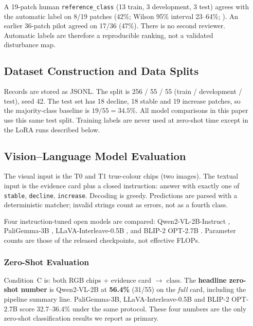 \documentclass[11pt]{article}
\begin{document}
A 19-patch human \texttt{reference\_class} (13 train, 3 development,
3 test) agrees with the automatic label on 8/19 patches (42\%;
Wilson 95\% interval 23--64\%; \citealp{wilson1927}). An earlier
36-patch pilot agreed on 17/36 (47\%). There is no second reviewer.
Automatic labels are therefore a reproducible ranking, not a
validated disturbance map.

\subsection{Dataset Construction and Data Splits}

Records are stored as JSONL. The split is 256 / 55 / 55 (train /
development / test), seed 42. The test set has 18 decline, 18 stable
and 19 increase patches, so the majority-class baseline is
$19/55=34.5\%$. All model comparisons in this paper use this same
test split. Training labels are never used at zero-shot time except
in the LoRA runs described below.

\subsection{Vision--Language Model Evaluation}

The visual input is the T0 and T1 true-colour chips (two images). The
textual input is the evidence card plus a closed instruction:
answer with exactly one of \texttt{stable}, \texttt{decline},
\texttt{increase}. Decoding is greedy. Predictions are parsed with a
deterministic matcher; invalid strings count as errors, not as a
fourth class.

Four instruction-tuned open models are compared:
Qwen2-VL-2B-Instruct \citep{wang2024qwen2vl},
PaliGemma-3B \citep{beyer2024},
LLaVA-Interleave-0.5B \citep{li2024interleave},
and BLIP-2 OPT-2.7B \citep{li2023blip2,zhang2022opt}.
Parameter counts are those of the released checkpoints, not
effective FLOPs.

\subsubsection{Zero-Shot Evaluation}

Condition~C is: both RGB chips + evidence card $\rightarrow$ class.
The \textbf{headline zero-shot number} is Qwen2-VL-2B at
\textbf{56.4\%} (31/55) on the \emph{full} card, including the
pipeline summary line. PaliGemma-3B, LLaVA-Interleave-0.5B and
BLIP-2 OPT-2.7B score 32.7--36.4\% under the same protocol. These
four numbers are the only zero-shot classification results we report
as primary.
\end{document}
